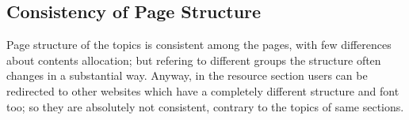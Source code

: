 \subsection{Consistency of Page Structure}
Page structure of the topics is consistent among the pages, with few differences about contents allocation; but refering to different groups the structure often changes in a substantial way.
Anyway, in the resource section users can be redirected to other websites which have a completely different structure and font too; so they are absolutely not consistent, contrary to the topics of same sections.